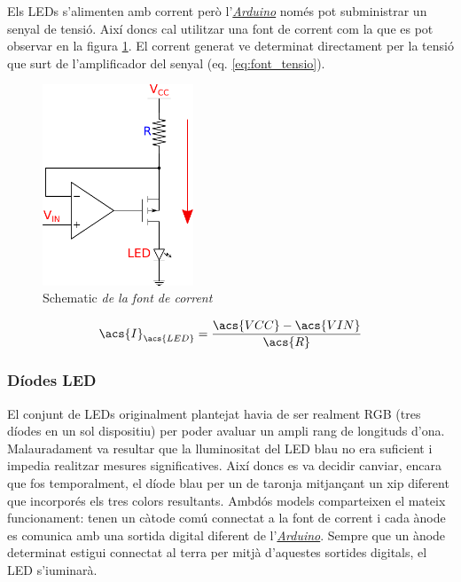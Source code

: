 Els \acp{LED} s'alimenten amb corrent però l'\hyperref[subsec:arduino]{\textit{Arduino}} només pot subministrar un senyal de tensió. Així doncs cal utilitzar una font de corrent com la que es pot observar en la figura \ref{fig:schematic_font_corrent}. El corrent generat ve determinat directament per la tensió que surt de l'amplificador del senyal (eq. \ref{eq:font_tensio}).

\begin{figure}[htp]
	\centering
	\includegraphics[width=0.4\textwidth]{Figures/schematic_font_corrent.pdf}
	\caption[Font de corrent]{Schematic\textit{ de la font de corrent}}
	\label{fig:schematic_font_corrent}
\end{figure}

\begin{equation}\label{eq:font_tensio}
\acs{I}_{\acs{LED}}=\frac{\acs{VCC}-\acs{VIN}}{\acs{R}}
\end{equation}

\subsubsection{Díodes \ac{LED} }

 El conjunt de \acp{LED} originalment plantejat havia de ser realment \ac{RGB} (tres díodes en un sol dispositiu) per poder avaluar un ampli rang de longituds d'ona. Malauradament va resultar que la lluminositat del \ac{LED} blau no era suficient i impedia realitzar mesures significatives. Així doncs es va decidir canviar, encara que fos temporalment, el díode blau per un de taronja mitjançant un xip diferent que incorporés els tres colors resultants. Ambdós models comparteixen el mateix funcionament: tenen un càtode comú connectat a la font de corrent i cada ànode es comunica amb una sortida digital diferent de l'\hyperref[subsec:arduino]{\textit{Arduino}}. Sempre que un ànode determinat estigui connectat al terra per mitjà d'aquestes sortides digitals, el \ac{LED} s'i\lgem uminarà.
 
